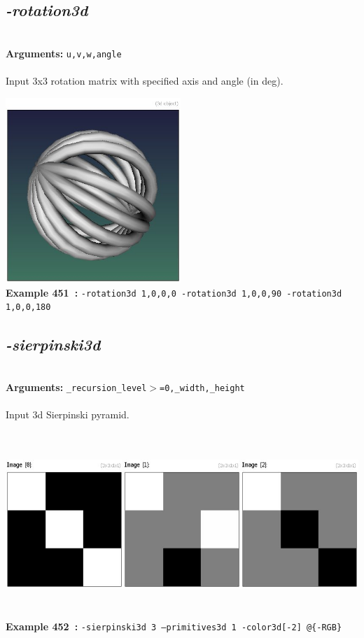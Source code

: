 \documentclass[a4paper,11pt,twoside]{book}
\begin{document}
\subsection{\emph{-rotation3d} }\vspace*{-0.5em}
~\\\textbf{Arguments: } 
{\small \texttt{u,v,w,angle}}\\~\\
Input 3x3 rotation matrix with specified axis and angle (in deg).
\begin{center}\includegraphics[keepaspectratio=true,height=7cm,width=\textwidth]{img/gmic_def451.jpg}\\
{\footnotesize \textbf{Example 451~:} \texttt{-rotation3d 1,0,0,0 -rotation3d 1,0,0,90 -rotation3d 1,0,0,180}}
\end{center}

\subsection{\emph{-sierpinski3d} }\vspace*{-0.5em}
~\\\textbf{Arguments: } 
{\small \texttt{\_recursion\_level$>$=0,\_width,\_height}}\\~\\
Input 3d Sierpinski pyramid.
\begin{center}\includegraphics[keepaspectratio=true,height=7cm,width=\textwidth]{img/gmic_def452.jpg}\\
{\footnotesize \textbf{Example 452~:} \texttt{-sierpinski3d 3 --primitives3d 1 -color3d[-2] @\{-RGB\}}}
\end{center}
\end{document}
